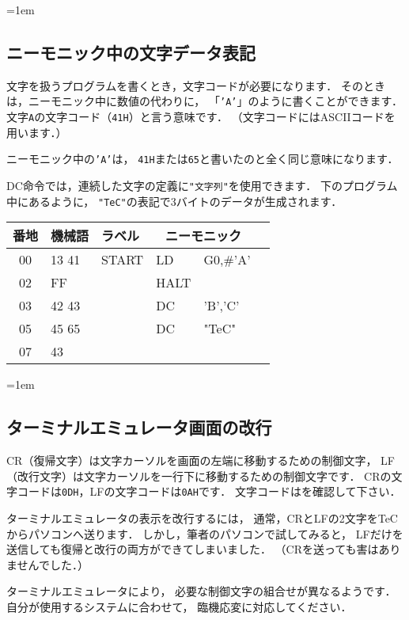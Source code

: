 \begin{framed}{\parindent=1em
    \subsection*{ニーモニック中の文字データ表記}

    文字を扱うプログラムを書くとき，文字コードが必要になります．
    そのときは，ニーモニック中に数値の代わりに，
    「\texttt{'A'}」のように書くことができます．
    文字\texttt{A}の文字コード（\texttt{41H}）と言う意味です．
    （文字コードにはASCIIコードを用います．）

    ニーモニック中の\texttt{'A'}は，
    \texttt{41H}または\texttt{65}と書いたのと全く同じ意味になります．

    DC命令では，連続した文字の定義に\texttt{"文字列"}を使用できます．
    下のプログラム中にあるように，
    \texttt{"TeC"}の表記で3バイトのデータが生成されます．

    {\ttfamily\small\begin{center}
      \begin{tabular}{|c|l|l|l l|l}
        \hline
        番地 & 機械語 & ラベル & \multicolumn{2}{|c|}{ニーモニック} \\
        \hline
        00 & 13 41 & START & LD   & G0,\#'A'        \\
        02 & FF    &       & HALT &                 \\ 
        03 & 42 43 &       & DC   & 'B','C'         \\ 
        05 & 45 65 &       & DC   & "TeC"           \\ 
        07 & 43    &       &      &                 \\
        \hline
      \end{tabular}
    \end{center}}
}\end{framed}

\begin{framed}{\parindent=1em
    \subsection*{ターミナルエミュレータ画面の改行}
    CR（復帰文字）は文字カーソルを画面の左端に移動するための制御文字，
    LF（改行文字）は文字カーソルを一行下に移動するための制御文字です．
    CRの文字コードは\texttt{0DH}，LFの文字コードは\texttt{0AH}です．
    文字コードはを確認して下さい．

    ターミナルエミュレータの表示を改行するには，
    通常，CRとLFの2文字をTeCからパソコンへ送ります．
    しかし，筆者のパソコンで試してみると，
    LFだけを送信しても復帰と改行の両方ができてしまいました．
    （CRを送っても害はありませんでした．）

    ターミナルエミュレータにより，
    必要な制御文字の組合せが異なるようです．
    自分が使用するシステムに合わせて，
    臨機応変に対応してください．
}\end{framed}

